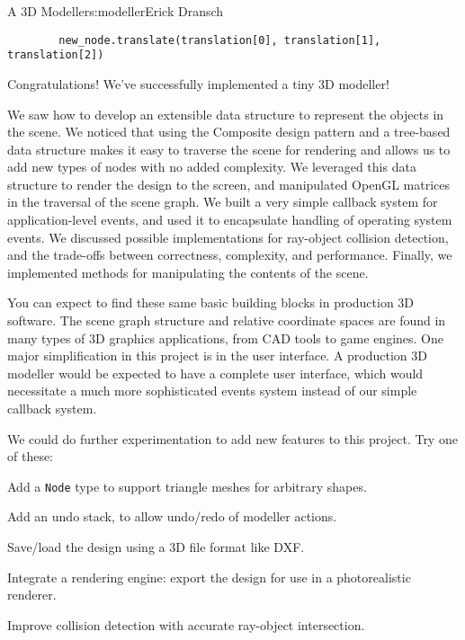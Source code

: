 \begin{aosachapter}{A 3D Modeller}{s:modeller}{Erick Dransch}
\begin{verbatim}
        new_node.translate(translation[0], translation[1], translation[2])
\end{verbatim}

\label{summary}

Congratulations! We've successfully implemented a tiny 3D modeller!


We saw how to develop an extensible data structure to represent the
objects in the scene. We noticed that using the Composite design pattern
and a tree-based data structure makes it easy to traverse the scene for
rendering and allows us to add new types of nodes with no added
complexity. We leveraged this data structure to render the design to the
screen, and manipulated OpenGL matrices in the traversal of the scene
graph. We built a very simple callback system for application-level
events, and used it to encapsulate handling of operating system events.
We discussed possible implementations for ray-object collision
detection, and the trade-offs between correctness, complexity, and
performance. Finally, we implemented methods for manipulating the
contents of the scene.

You can expect to find these same basic building blocks in production 3D
software. The scene graph structure and relative coordinate spaces are
found in many types of 3D graphics applications, from CAD tools to game
engines. One major simplification in this project is in the user
interface. A production 3D modeller would be expected to have a complete
user interface, which would necessitate a much more sophisticated events
system instead of our simple callback system.

We could do further experimentation to add new features to this project.
Try one of these:

\begin{aosaitemize}

\item
  Add a \texttt{Node} type to support triangle meshes for arbitrary
  shapes.
\item
  Add an undo stack, to allow undo/redo of modeller actions.
\item
  Save/load the design using a 3D file format like DXF.
\item
  Integrate a rendering engine: export the design for use in a
  photorealistic renderer.
\item
  Improve collision detection with accurate ray-object intersection.
\end{aosaitemize}


\end{aosachapter}
